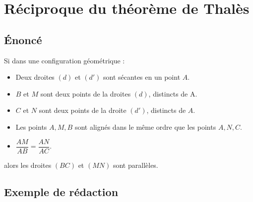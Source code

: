 \section{Réciproque du théorème de Thalès}
    \subsection{Énoncé}
        \begin{theoreme}[\admis]
            Si dans une configuration géométrique :
            \begin{itemize}
                \item Deux droites $(d)$ et $(d')$ sont sécantes en un point $A$.
                \item $B$ et $M$ sont deux points de la droites $(d)$, distincts de A.
                \item $C$ et $N$ sont deux points de la droite $(d')$, distincts de $A$.
                \item Les points $A, M, B$ sont alignés dans le même ordre que les points $A, N, C$.
                \item $\dfrac{AM}{AB} = \dfrac{AN}{AC}$.                
            \end{itemize}
            \medskip
            alors les droites $(BC)$ et $(MN)$ sont parallèles.
        \end{theoreme}

    \subsection{Exemple de rédaction}

